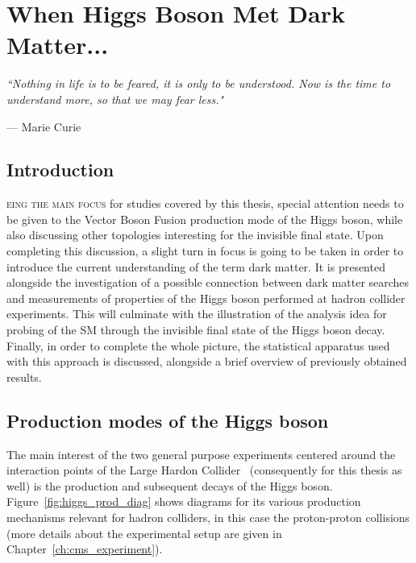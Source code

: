 \chapter{When Higgs Boson Met Dark Matter...}
\epigraph{\itshape``Nothing in life is to be feared, it is only to be understood. Now is the time to understand more, so that we may fear less."}{--- \textup{Marie Curie}}
\label{ch:Higgs_LHC_DM}
\section{Introduction}


\hspace{10pt}\lettrine[lines=2]{}{eing the main focus} for studies covered by this thesis, special attention needs to be given to the Vector Boson Fusion production mode of the Higgs boson, while also discussing other topologies interesting for the invisible final state. Upon completing this discussion, a slight turn in focus is going to be taken in order to introduce the current understanding of the term dark matter. It is presented alongside the investigation of a possible connection between dark matter searches and measurements of properties of the Higgs boson performed at hadron collider experiments. This will culminate with the illustration of the analysis idea for probing of the SM through the invisible final state of the Higgs boson decay. Finally, in order to complete the whole picture, the statistical apparatus used with this approach is discussed, alongside a brief overview of previously obtained results.


\section{Production modes of the Higgs boson}
\label{sec:prod_higgs}
\hspace{10pt} The main interest of the two general purpose experiments centered around the interaction points of the Large Hardon Collider~\cite{LHC_TDR} (consequently for this thesis as well) is the production and subsequent decays of the Higgs boson. Figure~\ref{fig:higgs_prod_diag} shows diagrams for its various production mechanisms relevant for hadron colliders, in this case the proton-proton collisions (more details about the experimental setup are given in Chapter~\ref{ch:cms_experiment}).

